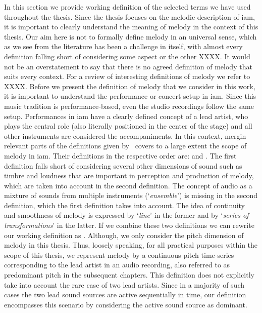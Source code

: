 In this section we provide working definition of the selected terms we have used throughout the thesis. Since the thesis focuses on the melodic description of \gls{iam}, it is important to clearly understand the meaning of melody in the context of this thesis. Our aim here is not to formally define melody in an universal sense, which as we see from the literature has been a challenge in itself, with almost every definition falling short of considering some aspect or the other XXXX. It would not be an overstatement to say that there is no agreed definition of melody that suits every context. For a review of interesting definitions of melody we refer to XXXX. Before we present the definition of melody that we consider in this work, it is important to understand the performance or concert setup in \gls{iam}. Since this music tradition is performance-based, even the studio recordings follow the same setup. Performances in \gls{iam} have a clearly defined concept of a lead artist, who plays the central role (also literally positioned in the center of the stage) and all other instruments are considered the accompaniments. In this context, mergin relevant parts of the definitions given by~\cite{paiva2006melody,kim2000analysis,levitin2002memory} covers to a large extent the scope of melody in \gls{iam}. Their definitions in the respective order are:  and .  The first definition falls short of considering several other dimensions of sound such as timbre and loudness that are important in perception and production of melody, which are taken into account in the second definition. The concept of audio as a mixture of sounds from multiple instruments (`\textit{ensemble}') is missing in the second definition, which the first definition takes into account. The idea of continuity and smoothness of melody is expressed by `\textit{line}' in the former and by `\textit{series of transformations}' in the latter. If we combine these two definitions we can rewrite our working definition as . Although, we only consider the pitch dimension of melody in this thesis. Thus, loosely speaking, for all practical purposes within the scope of this thesis, we represent melody by a continuous pitch time-series corresponding to the lead artist in an audio recording, also referred to as predominant pitch in the subsequent chapters. This definition does not explicitly take into account the rare case of two lead artists. Since in a majority of such cases the two lead sound sources are active sequentially in time, our definition encompasses this scenario by considering the active sound source as dominant. 

